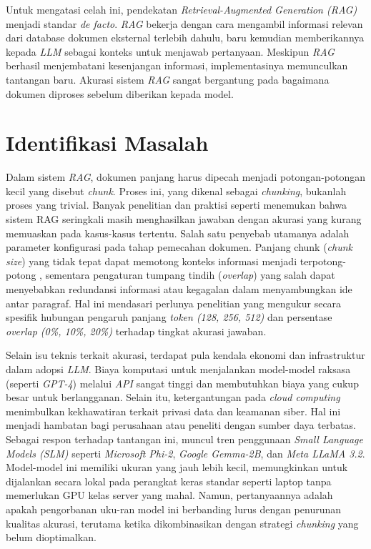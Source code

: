 Untuk mengatasi celah ini, pendekatan \textit{Retrieval-Augmented Generation (RAG)} menjadi standar \textit{de facto}. \textit{RAG} bekerja dengan cara mengambil informasi relevan dari database dokumen eksternal terlebih dahulu, baru kemudian memberikannya kepada \textit{LLM} sebagai konteks untuk menjawab pertanyaan. Meskipun \textit{RAG} berhasil menjembatani kesenjangan informasi, implementasinya memunculkan tantangan baru. Akurasi sistem \textit{RAG} sangat bergantung pada bagaimana dokumen diproses sebelum diberikan kepada model.

\section{Identifikasi Masalah}
Dalam sistem \textit{RAG}, dokumen panjang harus dipecah menjadi potongan-potongan kecil yang disebut \textit{chunk}. Proses ini, yang dikenal sebagai \textit{chunking}, bukanlah proses yang trivial. Banyak penelitian dan praktisi seperti \cite{edge2025localglobalgraphrag} menemukan bahwa sistem RAG seringkali masih menghasilkan jawaban dengan akurasi yang kurang memuaskan pada kasus-kasus tertentu. Salah satu penyebab utamanya adalah parameter konfigurasi pada tahap pemecahan dokumen. Panjang chunk (\textit{chunk size}) yang tidak tepat dapat memotong konteks informasi menjadi terpotong-potong \citep{Liu2023LostIT}, sementara pengaturan tumpang tindih (\textit{overlap}) yang salah dapat menyebabkan redundansi informasi atau kegagalan dalam menyambungkan ide antar paragraf. Hal ini mendasari perlunya penelitian yang mengukur secara spesifik hubungan pengaruh panjang \textit{token (128, 256, 512)} dan persentase \textit{overlap (0\%, 10\%, 20\%)} terhadap tingkat akurasi jawaban.

Selain isu teknis terkait akurasi, terdapat pula kendala ekonomi dan infrastruktur dalam adopsi \textit{LLM}. Biaya komputasi untuk menjalankan model-model raksasa (seperti \textit{GPT-4}) melalui \textit{API} sangat tinggi dan membutuhkan biaya yang cukup besar untuk berlangganan. Selain itu, ketergantungan pada \textit{cloud computing} menimbulkan kekhawatiran terkait privasi data dan keamanan siber. Hal ini menjadi hambatan bagi perusahaan atau peneliti dengan sumber daya terbatas. Sebagai respon terhadap tantangan ini, muncul tren penggunaan \textit{Small Language Models (SLM)} seperti \textit{Microsoft Phi-2}, \textit{Google Gemma-2B}, dan \textit{Meta LLaMA 3.2}. Model-model ini memiliki ukuran yang jauh lebih kecil, memungkinkan untuk dijalankan secara lokal pada perangkat keras standar seperti laptop tanpa memerlukan GPU kelas server yang mahal. Namun, pertanyaannya adalah apakah pengorbanan uku-ran model ini berbanding lurus dengan penurunan kualitas akurasi, terutama ketika dikombinasikan dengan strategi \textit{chunking} yang belum dioptimalkan.

